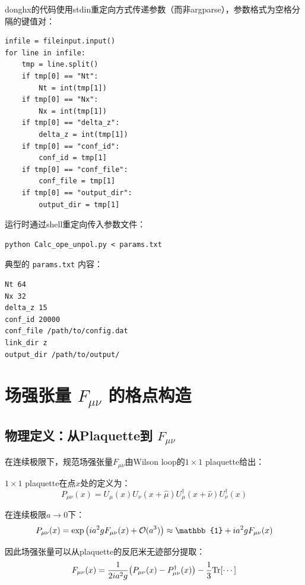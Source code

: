 \documentclass[12pt,a4paper]{ctexart}
\begin{document}
donghx的代码使用stdin重定向方式传递参数（而非argparse），参数格式为空格分隔的键值对：

\begin{codebox}
\begin{lstlisting}[style=pythonstyle]
infile = fileinput.input()
for line in infile:
    tmp = line.split()
    if tmp[0] == "Nt":
        Nt = int(tmp[1])
    if tmp[0] == "Nx":
        Nx = int(tmp[1])
    if tmp[0] == "delta_z":
        delta_z = int(tmp[1])
    if tmp[0] == "conf_id":
        conf_id = tmp[1]
    if tmp[0] == "conf_file":
        conf_file = tmp[1]
    if tmp[0] == "output_dir":
        output_dir = tmp[1]
\end{lstlisting}
\end{codebox}

运行时通过shell重定向传入参数文件：
\begin{lstlisting}[style=bashstyle]
python Calc_ope_unpol.py < params.txt
\end{lstlisting}

典型的 \texttt{params.txt} 内容：
\begin{verbatim}
Nt 64
Nx 32
delta_z 15
conf_id 20000
conf_file /path/to/config.dat
link_dir z
output_dir /path/to/output/
\end{verbatim}

\section{场强张量 $F_{\mu\nu}$ 的格点构造}

\subsection{物理定义：从Plaquette到 $F_{\mu\nu}$}

在连续极限下，规范场强张量$F_{\mu\nu}$由Wilson loop的$1\times 1$ plaquette给出：

\begin{physbox}[Plaquette与场强张量的关系]
$1\times 1$ plaquette在点$x$处的定义为：
\begin{equation}
    P_{\mu\nu}(x) = U_\mu(x) U_\nu(x+\hat{\mu}) U_\mu^\dagger(x+\hat{\nu}) U_\nu^\dagger(x)
    \label{eq:plaquette}
\end{equation}

在连续极限$a\to 0$下：
\begin{equation}
    P_{\mu\nu}(x) = \exp\pqty{i a^2 g F_{\mu\nu}(x) + \mathcal{O}(a^3)}
    \approx \mathbb{1} + i a^2 g F_{\mu\nu}(x)
    \label{eq:plaquette_exp}
\end{equation}

因此场强张量可以从plaquette的反厄米无迹部分提取：
\begin{equation}
    F_{\mu\nu}(x) = \frac{1}{2i a^2 g} \pqty{P_{\mu\nu}(x) - P_{\mu\nu}^\dagger(x)} - \frac{1}{3}\text{Tr}[\cdots]
    \label{eq:F_from_P}
\end{equation}
\end{physbox}
\end{document}
